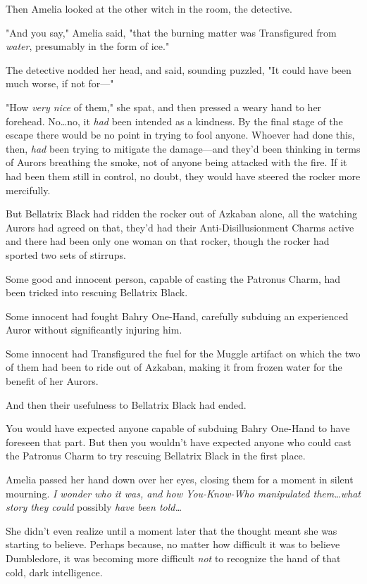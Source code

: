 Then Amelia looked at the other witch in the room, the detective.

"And you say," Amelia said, "that the burning matter was Transfigured from
\emph{water}, presumably in the form of ice."

The detective nodded her head, and said, sounding puzzled, "It could have been
much worse, if not for—"

"How \emph{very nice} of them," she spat, and then pressed a weary hand to her
forehead. No…no, it \emph{had} been intended as a kindness. By the
final stage of the escape there would be no point in trying to fool anyone.
Whoever had done this, then, \emph{had} been trying to mitigate the
damage—and they'd been thinking in terms of Aurors breathing the smoke, not
of anyone being attacked with the fire. If it had been them still in control,
no doubt, they would have steered the rocker more mercifully.

But Bellatrix Black had ridden the rocker out of Azkaban alone, all the
watching Aurors had agreed on that, they'd had their Anti-Disillusionment
Charms active and there had been only one woman on that rocker, though the
rocker had sported two sets of stirrups.

Some good and innocent person, capable of casting the Patronus Charm, had been
tricked into rescuing Bellatrix Black.

Some innocent had fought Bahry One-Hand, carefully subduing an experienced
Auror without significantly injuring him.

Some innocent had Transfigured the fuel for the Muggle artifact on which the
two of them had been to ride out of Azkaban, making it from frozen water for
the benefit of her Aurors.

And then their usefulness to Bellatrix Black had ended.

You would have expected anyone capable of subduing Bahry One-Hand to have
foreseen that part. But then you wouldn't have expected anyone who could cast
the Patronus Charm to try rescuing Bellatrix Black in the first place.

Amelia passed her hand down over her eyes, closing them for a moment in silent
mourning. \emph{I wonder who it was, and how You-Know-Who manipulated
them…what story they could} possibly \emph{have been told…}

She didn't even realize until a moment later that the thought meant she was
starting to believe. Perhaps because, no matter how difficult it was to believe
Dumbledore, it was becoming more difficult \emph{not} to recognize the hand of
that cold, dark intelligence.

